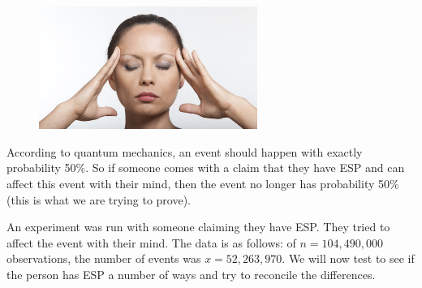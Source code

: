 \documentclass[12pt]{article}
\begin{document}

\begin{figure}[htp]
\centering
\includegraphics[width=2.8in]{esp.jpg}
\end{figure}

According to quantum mechanics, an event should happen with exactly probability 50\%. So if someone comes with a claim that they have ESP and can affect this event with their mind, then the event no longer has probability 50\% (this is what we are trying to prove).

An experiment was run with someone claiming they have ESP. They tried to affect the event with their mind. The data is as follows: of $n= 104,490,000$ observations, the number of events was $x = 52,263,970$. We will now test to see if the person has ESP a number of ways and try to reconcile the differences.

\begin{enumerate}








\end{enumerate}
\end{document}
